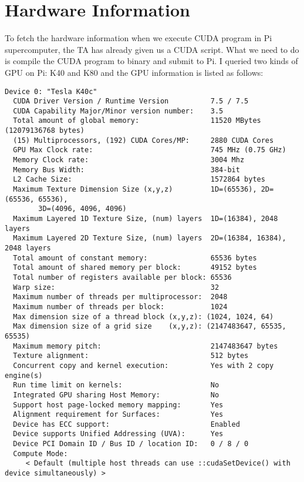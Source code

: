 \documentclass{article}
\begin{document}
\section{Hardware Information}
To fetch the hardware information when we execute CUDA program in Pi supercomputer, the TA has already given us a CUDA script. What we need to do is compile the CUDA program to binary and submit to Pi. I queried two kinds of GPU on Pi: K40 and K80 and the GPU information is listed as follows:
\begin{verbatim}
Device 0: "Tesla K40c"
  CUDA Driver Version / Runtime Version          7.5 / 7.5
  CUDA Capability Major/Minor version number:    3.5
  Total amount of global memory:                 11520 MBytes (12079136768 bytes)
  (15) Multiprocessors, (192) CUDA Cores/MP:     2880 CUDA Cores
  GPU Max Clock rate:                            745 MHz (0.75 GHz)
  Memory Clock rate:                             3004 Mhz
  Memory Bus Width:                              384-bit
  L2 Cache Size:                                 1572864 bytes
  Maximum Texture Dimension Size (x,y,z)         1D=(65536), 2D=(65536, 65536), 
  		3D=(4096, 4096, 4096)
  Maximum Layered 1D Texture Size, (num) layers  1D=(16384), 2048 layers
  Maximum Layered 2D Texture Size, (num) layers  2D=(16384, 16384), 2048 layers
  Total amount of constant memory:               65536 bytes
  Total amount of shared memory per block:       49152 bytes
  Total number of registers available per block: 65536
  Warp size:                                     32
  Maximum number of threads per multiprocessor:  2048
  Maximum number of threads per block:           1024
  Max dimension size of a thread block (x,y,z): (1024, 1024, 64)
  Max dimension size of a grid size    (x,y,z): (2147483647, 65535, 65535)
  Maximum memory pitch:                          2147483647 bytes
  Texture alignment:                             512 bytes
  Concurrent copy and kernel execution:          Yes with 2 copy engine(s)
  Run time limit on kernels:                     No
  Integrated GPU sharing Host Memory:            No
  Support host page-locked memory mapping:       Yes
  Alignment requirement for Surfaces:            Yes
  Device has ECC support:                        Enabled
  Device supports Unified Addressing (UVA):      Yes
  Device PCI Domain ID / Bus ID / location ID:   0 / 8 / 0
  Compute Mode:
     < Default (multiple host threads can use ::cudaSetDevice() with device simultaneously) >
\end{verbatim}
\end{document}
